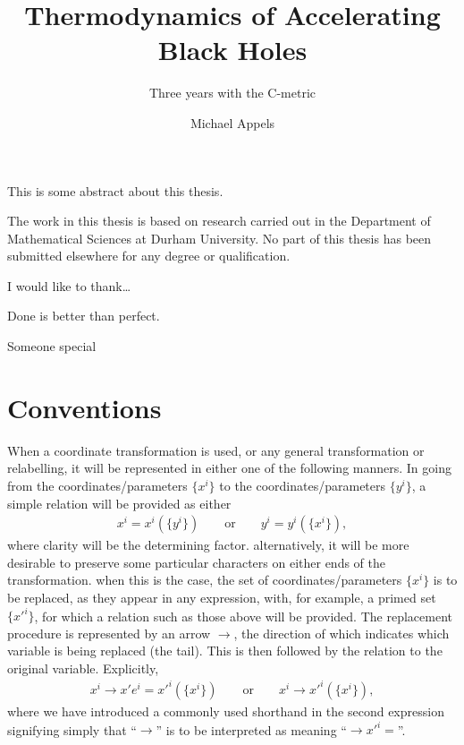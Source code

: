 \documentclass[
twoside,openright,frontopenright]{dmathesis}
\begin{document}
\title{Thermodynamics of Accelerating Black Holes}
\subtitle{Three years with the C-metric}
\author{Michael Appels}
\maketitlepage*

\begin{abstract*}
%
  This is some abstract about this thesis.
%
\end{abstract*}

\begin{declaration*}
%
  The work in this thesis is based on research carried out in the Department of
  Mathematical Sciences at Durham University. No part of this thesis has been
  submitted elsewhere for any degree or qualification.
%
\end{declaration*}

\begin{acknowledgements*}
%
  I would like to thank\ldots
%
\end{acknowledgements*}

\begin{epigraph*}
%
  Done is better than perfect.
%
\end{epigraph*}

\begin{dedication*}
%
  Someone special 
%
\end{dedication*}

\disableprotrusion
\tableofcontents*
\enableprotrusion

\cleardoublepage
{}

\chapter*{Conventions}
When a coordinate transformation is used, or any general transformation or
relabelling, it will be represented in either one of the following manners. In
going from the coordinates/parameters $\{x^i\}$ to the coordinates/parameters
$\{y^i\}$, a simple relation will be provided as either
\begin{align*}
  x^i = x^i(\{y^i\})\qquad \mbox{or} \qquad y^i = y^i(\{x^i\}),
\end{align*}
where clarity will be the determining factor. alternatively, it will be more
desirable to preserve some particular characters on either ends of the
transformation. when this is the case, the set of coordinates/parameters
$\{x^i\}$ is to be replaced, as they appear in any expression, with, for
example, a primed set $\{x'^i\}$, for which a relation such as those above
will be provided. The replacement procedure is represented by an arrow $\to$,
the direction of which indicates which variable is being replaced (the
tail). This is then followed by the relation to the original
variable. Explicitly,
\begin{align*}
  x^i \to x'e^i=x'^i(\{x^i\}) \qquad \mbox{or} \qquad x^i \to x'^i(\{x^i\}),
\end{align*}
where we have introduced a commonly used shorthand in the second expression
signifying simply that ``$\to$'' is to be interpreted as meaning
``$\to x'^i =$''.
\end{document}
